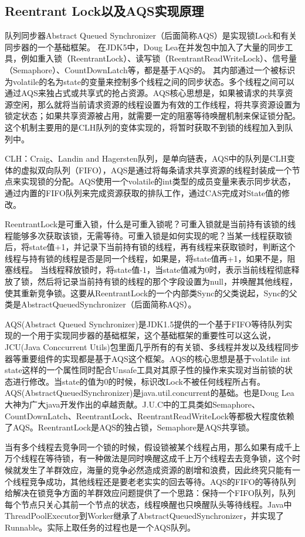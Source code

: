 \documentclass[../../../interview-questions.tex]{subfiles}
\begin{document}
\subsection{Reentrant Lock以及AQS实现原理}

队列同步器Abstract Queued Synchronizer（后面简称AQS）是实现锁Lock和有关同步器的一个基础框架。
在JDK5中，Doug Lea在并发包中加入了大量的同步工具，例如重入锁（ReentrantLock）、读写锁（ReentrantReadWriteLock）、信号量（Semaphore）、CountDownLatch等，都是基于AQS的。
其内部通过一个被标识为volatile的名为state的变量来控制多个线程之间的同步状态。多个线程之间可以通过AQS来独占式或共享式的抢占资源。AQS核心思想是，如果被请求的共享资源空闲，那么就将当前请求资源的线程设置为有效的工作线程，将共享资源设置为锁定状态；如果共享资源被占用，就需要一定的阻塞等待唤醒机制来保证锁分配。这个机制主要用的是CLH队列的变体实现的，将暂时获取不到锁的线程加入到队列中。

CLH：Craig、Landin and Hagersten队列，是单向链表，AQS中的队列是CLH变体的虚拟双向队列（FIFO），AQS是通过将每条请求共享资源的线程封装成一个节点来实现锁的分配。AQS使用一个volatile的int类型的成员变量来表示同步状态，通过内置的FIFO队列来完成资源获取的排队工作，通过CAS完成对State值的修改。

ReentrantLock是可重入锁，什么是可重入锁呢？可重入锁就是当前持有该锁的线程能够多次获取该锁，无需等待。可重入锁是如何实现的呢？当某一线程获取锁后，将state值+1，并记录下当前持有锁的线程，再有线程来获取锁时，判断这个线程与持有锁的线程是否是同一个线程，如果是，将state值再+1，如果不是，阻塞线程。
当线程释放锁时，将state值-1，当state值减为0时，表示当前线程彻底释放了锁，然后将记录当前持有锁的线程的那个字段设置为null，并唤醒其他线程，使其重新竞争锁。这要从ReentrantLock的一个内部类Sync的父类说起，Sync的父类是AbstractQueuedSynchronizer（后面简称AQS）。

AQS(Abstract Queued Synchronizer)是JDK1.5提供的一个基于FIFO等待队列实现的一个用于实现同步器的基础框架，这个基础框架的重要性可以这么说，JCU(Java Conccurrent Utils)包里面几乎所有的有关锁、多线程并发以及线程同步器等重要组件的实现都是基于AQS这个框架。AQS的核心思想是基于volatile int state这样的一个属性同时配合Unsafe工具对其原子性的操作来实现对当前锁的状态进行修改。当state的值为0的时候，标识改Lock不被任何线程所占有。AQS(AbstractQueuedSynchronizer)是java.util.concurrent的基础。也是Doug Lea大神为广大java开发作出的卓越贡献。J.U.C中的工具类如Semaphore、CountDownLatch、ReentrantLock、ReentrantReadWriteLock等都极大程度依赖了AQS。ReentrantLock是AQS的独占锁，Semaphore是AQS共享锁。

当有多个线程去竞争同一个锁的时候，假设锁被某个线程占用，那么如果有成千上万个线程在等待锁，有一种做法是同时唤醒这成千上万个线程去去竞争锁，这个时候就发生了羊群效应，海量的竞争必然造成资源的剧增和浪费，因此终究只能有一个线程竞争成功，其他线程还是要老老实实的回去等待。AQS的FIFO的等待队列给解决在锁竞争方面的羊群效应问题提供了一个思路：保持一个FIFO队列，队列每个节点只关心其前一个节点的状态，线程唤醒也只唤醒队头等待线程。Java中ThreadPoolExecutor到Worker继承了AbstractQueuedSynchronizer，并实现了Runnable。实际上取任务的过程也是一个AQS队列。
\end{document}
